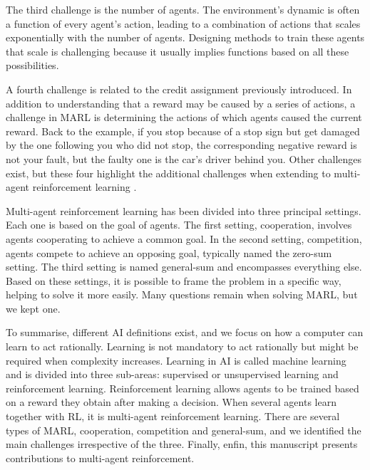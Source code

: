 The third challenge is the number of agents.
The environment's dynamic is often a function of every agent's action, leading to a combination of actions that scales exponentially with the number of agents.
Designing methods to train these agents that scale is challenging because it usually implies functions based on all these possibilities.

A fourth challenge is related to the credit assignment previously introduced.
In addition to understanding that a reward may be caused by a series of actions, a challenge in MARL is determining the actions of which agents caused the current reward.
Back to the example, if you stop because of a stop sign but get damaged by the one following you who did not stop, the corresponding negative reward is not your fault, but the faulty one is the car's driver behind you.
Other challenges exist, but these four highlight the additional challenges when extending to multi-agent reinforcement learning \cite{marl-book}.

Multi-agent reinforcement learning has been divided into three principal settings.
Each one is based on the goal of agents.
The first setting, cooperation, involves agents cooperating to achieve a common goal.
In the second setting, competition, agents compete to achieve an opposing goal, typically named the zero-sum setting.
The third setting is named general-sum and encompasses everything else.
Based on these settings, it is possible to frame the problem in a specific way, helping to solve it more easily.
Many questions remain when solving MARL, but we kept one.

To summarise, different AI definitions exist, and we focus on how a computer can learn to act rationally.
Learning is not mandatory to act rationally but might be required when complexity increases.
Learning in AI is called machine learning and is divided into three sub-areas: supervised or unsupervised learning and reinforcement learning.
Reinforcement learning allows agents to be trained based on a reward they obtain after making a decision.
When several agents learn together with RL, it is multi-agent reinforcement learning.
There are several types of MARL, cooperation, competition and general-sum, and we identified the main challenges irrespective of the three.
Finally, enfin, this manuscript presents contributions to multi-agent reinforcement.

